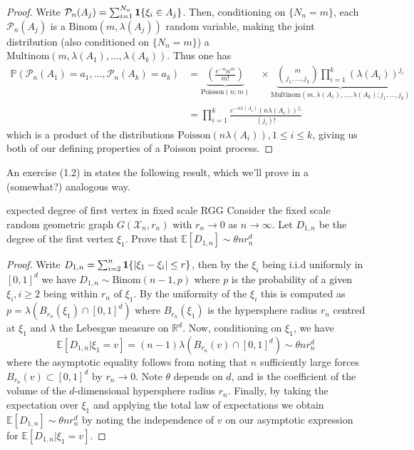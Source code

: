 \documentclass{article}
\begin{document}
\begin{proof}
Write $\mathcal{P}_n(A_j) = \sum_{i=1}^{N_n} {\bf 1}\{\xi_i \in A_j\}$. Then, conditioning on $\{N_n = m\}$, each 
$\mathcal{P}_n(A_j)$ is a $\text{Binom}(m, \lambda(A_j))$ random variable, making the joint distribution (also 
conditioned on $\{N_n = m\}$) a $\text{Multinom}(m, \lambda(A_1), \dots, \lambda(A_k))$. Thus one has 
\begin{align*}\mathbb{P}(\mathcal{P}_n(A_1) = a_1, \dots, \mathcal{P}_n(A_k) = a_k) &= 
\underbrace{\left(\frac{e^{-n}n^m}{m!}\right)}_{\text{Poisson}(n ; m)} \quad \times 
\underbrace{\binom{m}{j_1, \dots, j_k}\prod_{i=1}^k {(\lambda(A_i))}^{j_i}}_{\text{Multinom}(m, \lambda(A_1), \dots, \lambda(A_k) ; j_1, \dots, j_k)} \\
&= \prod_{i=1}^k \frac{e^{-n\lambda(A_i)}(n\lambda(A_i))^{j_i}}{(j_i)!}
\end{align*}
which is a product of the distributions $\text{Poisson}(n\lambda(A_i)), 1 \leq i \leq k$, giving us both of our 
defining properties of a Poisson point process. 
\end{proof}

An exercise (1.2) in \cite{Penrose_et_al_2016} states the following result, which we'll prove in a (somewhat?) 
analogous way.

\begin{proposition}[]{expected degree of first vertex in fixed scale RGG}
    Consider the fixed scale random geometric graph $G(\mathcal{X}_n, r_n)$ with $r_n \to 0$ as $n \to \infty$. Let 
    $D_{1, n}$ be the degree of the first vertex $\xi_1$. Prove that $\mathbb{E}[D_{1, n}] \sim \theta n r_n^d$
\end{proposition}

\begin{proof}
Write $D_{1,n} = \sum_{i = 2}^{n} {\bf 1}\{\lvert \xi_1 - \xi_i \rvert \leq r\}$, then by the $\xi_i$ being i.i.d 
uniformly in $[0,1]^d$ we have $D_{1,n} \sim \text{Binom}(n-1, p)$ where $p$ is the probability of a given $\xi_i, i \geq 2$ 
being within $r_n$ of $\xi_1$. By the uniformity of the $\xi_i$ this is computed as $p = \lambda(B_{r_n}(\xi_1)
\cap [0,1]^d)$ where $B_{r_n}(\xi_1)$ is the hypersphere radius $r_n$ centred at $\xi_1$ and $\lambda$ the 
Lebesgue measure on $\mathbb{R}^d$. Now, conditioning on $\xi_1$, we have 
\[\mathbb{E}[D_{1,n} | \xi_1 = v] = (n-1)\lambda(B_{r_n}(v) \cap [0,1]^d) \sim \theta n r_n^d\]
where the asymptotic equality follows from noting that $n$ sufficiently large forces $B_{r_n}(v) \subset [0,1]^d$ 
by $r_n \to 0$. Note $\theta$ depends on $d$, and is the coefficient of the volume of the $d$-dimensional hypersphere
radius $r_n$. Finally, by taking the expectation over $\xi_1$ and applying the total law of expectations 
we obtain $\mathbb{E}[D_{1,n}] \sim \theta n r_n^d$ by noting the independence of $v$ on our asymptotic expression 
for $\mathbb{E}[D_{1, n} | \xi_1 = v]$.
\end{proof}
\end{document}
